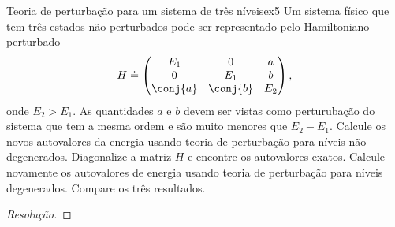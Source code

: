 \begin{exercício}{Teoria de perturbação para um sistema de três níveis}{ex5}
    Um sistema físico que tem três estados não perturbados pode ser representado pelo Hamiltoniano perturbado
    \begin{equation*}
        H \doteq \begin{pmatrix}
           E_1 & 0 & a\\
           0 & E_1 & b\\
           \conj{a} & \conj{b} & E_2
        \end{pmatrix},
    \end{equation*}
    onde \(E_2 > E_1\). As quantidades \(a\) e \(b\) devem ser vistas como perturubação do sistema que tem a mesma ordem e são muito menores que \(E_2 - E_1.\) Calcule os novos autovalores da energia usando teoria de perturbação para níveis não degenerados. Diagonalize a matriz \(H\) e encontre os autovalores exatos. Calcule novamente os autovalores de energia usando teoria de perturbação para níveis degenerados. Compare os três resultados.
\end{exercício}
\begin{proof}[Resolução]
    
\end{proof}
